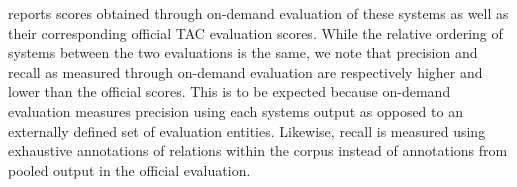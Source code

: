  reports scores obtained through on-demand evaluation of these systems as well as their corresponding official TAC evaluation scores.
While the relative ordering of systems between the two evaluations is the same, we note that precision and recall as measured through on-demand evaluation are respectively higher and lower than the official scores.
This is to be expected because on-demand evaluation measures precision using each systems output as opposed to an externally defined set of evaluation entities.
Likewise, recall is measured using exhaustive annotations of relations within the corpus instead of annotations from pooled output in the official evaluation.  
